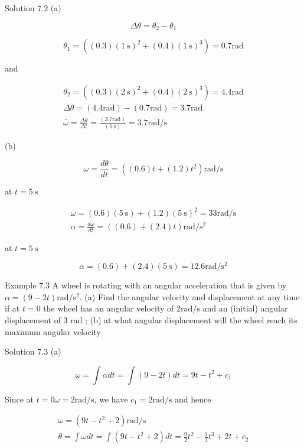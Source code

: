 \documentclass[10pt]{article}
\numberwithin{equation}{section}
\begin{document}
Solution 7.2 (a)

$$
\Delta \theta=\theta_{2}-\theta_{1}
$$

$$
\theta_{1}=\left((0.3)(1 \mathrm{~s})^{2}+(0.4)(1 \mathrm{~s})^{3}\right)=0.7 \mathrm{rad}
$$

and

$$
\begin{gathered}
\theta_{2}=\left((0.3)(2 \mathrm{~s})^{2}+(0.4)(2 \mathrm{~s})^{3}\right)=4.4 \mathrm{rad} \\
\Delta \theta=(4.4 \mathrm{rad})-(0.7 \mathrm{rad})=3.7 \mathrm{rad} \\
\bar{\omega}=\frac{\Delta \theta}{\Delta t}=\frac{(3.7 \mathrm{rad})}{(1 \mathrm{~s})}=3.7 \mathrm{rad} / \mathrm{s}
\end{gathered}
$$

(b)

$$
\omega=\frac{d \theta}{d t}=\left((0.6) t+(1.2) t^{2}\right) \mathrm{rad} / \mathrm{s}
$$

at $t=5 \mathrm{~s}$

$$
\begin{gathered}
\omega=(0.6)(5 \mathrm{~s})+(1.2)(5 \mathrm{~s})^{2}=33 \mathrm{rad} / \mathrm{s} \\
\alpha=\frac{d \omega}{d t}=((0.6)+(2.4) t) \mathrm{rad} / \mathrm{s}^{2}
\end{gathered}
$$

at $t=5 \mathrm{~s}$

$$
\alpha=(0.6)+(2.4)(5 \mathrm{~s})=12.6 \mathrm{rad} / \mathrm{s}^{2}
$$

Example 7.3 A wheel is rotating with an angular acceleration that is given by $\alpha=(9-2 t) \mathrm{rad} / \mathrm{s}^{2}$. (a) Find the angular velocity and displacement at any time if at $t=0$ the wheel has an angular velocity of $2 \mathrm{rad} / \mathrm{s}$ and an (initial) angular displacement of 3 rad ; (b) at what angular displacement will the wheel reach its maximum angular velocity

Solution 7.3 (a)

$$
\omega=\int \alpha d t=\int(9-2 t) d t=9 t-t^{2}+c_{1}
$$

Since at $t=0 \omega=2 \mathrm{rad} / \mathrm{s}$, we have $c_{1}=2 \mathrm{rad} / \mathrm{s}$ and hence

$$
\begin{gathered}
\omega=\left(9 t-t^{2}+2\right) \mathrm{rad} / \mathrm{s} \\
\theta=\int \omega d t=\int\left(9 t-t^{2}+2\right) d t=\frac{9}{2} t^{2}-\frac{1}{3} t^{3}+2 t+c_{2}
\end{gathered}
$$
\end{document}
